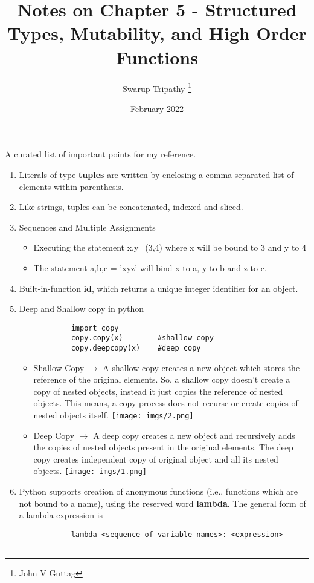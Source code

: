 \documentclass[11pt]{article}
\title{Notes on Chapter 5 - Structured Types, Mutability, and High Order Functions}
\author{Swarup Tripathy \thanks{John V Guttag}}
\date{February 2022}
\begin{document}
    \maketitle
    A curated list of important points for my reference.\\
    \begin{enumerate}
        \item Literals of type \textbf{tuples} are written by enclosing a comma separated list of elements within parenthesis.
        \item Like strings, tuples can be concatenated, indexed and sliced.
        \item Sequences and Multiple Assignments
        \begin{itemize}
            \item Executing the statement x,y=(3,4) where x will be bound to 3 and y to 4
            \item The statement a,b,c = 'xyz' will bind x to a, y to b and z to c.
        \end{itemize}
        \item Built-in-function \textbf{id}, which returns a unique integer identifier for an object.
        \item Deep and Shallow copy in python
        \begin{verbatim}
            import copy
            copy.copy(x)        #shallow copy
            copy.deepcopy(x)    #deep copy
        \end{verbatim}
        \begin{itemize}
            \item Shallow Copy $\rightarrow$ A shallow copy creates a new object which stores the reference of the original elements.
            So, a shallow copy doesn't create a copy of nested objects, instead it just copies the reference of nested objects. This means, a copy process does not recurse or create copies of nested objects itself.
            \centering
            \texttt{[image: imgs/2.png]}

            \item Deep Copy $\rightarrow$ A deep copy creates a new object and recursively adds the copies of nested objects present in the original elements.
            The deep copy creates independent copy of original object and all its nested objects.
            \centering
            \texttt{[image: imgs/1.png]}
        \end{itemize}
        \item Python supports creation of anonymous functions (i.e., functions which are not bound to a name), using the reserved word \textbf{lambda}. The general form of a lambda expression is
        \begin{verbatim}
            lambda <sequence of variable names>: <expression>


\end{verbatim}
\end{enumerate}
\end{document}
